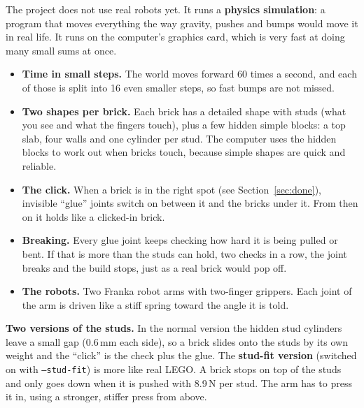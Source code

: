 \documentclass[11pt,a4paper]{article}
\begin{document}
The project does not use real robots yet. It runs a \textbf{physics
simulation}: a program that moves everything the way gravity, pushes and
bumps would move it in real life. It runs on the computer's graphics card,
which is very fast at doing many small sums at once.

\begin{itemize}
\item \textbf{Time in small steps.} The world moves forward 60 times a second,
      and each of those is split into 16 even smaller steps, so fast bumps are
      not missed.
\item \textbf{Two shapes per brick.} Each brick has a detailed shape with
      studs (what you see and what the fingers touch), plus a few hidden simple
      blocks: a top slab, four walls and one cylinder per stud. The computer uses
      the hidden blocks to work out when bricks touch, because simple shapes are
      quick and reliable.
\item \textbf{The click.} When a brick is in the right spot (see
      Section~\ref{sec:done}), invisible ``glue'' joints switch on between it and
      the bricks under it. From then on it holds like a clicked-in brick.
\item \textbf{Breaking.} Every glue joint keeps checking how hard it is being
      pulled or bent. If that is more than the studs can hold, two checks in a row,
      the joint breaks and the build stops, just as a real brick would pop off.
\item \textbf{The robots.} Two Franka robot arms with two-finger grippers. Each
      joint of the arm is driven like a stiff spring toward the angle it is told.
\end{itemize}

\textbf{Two versions of the studs.} In the normal version the hidden stud
cylinders leave a small gap (0.6\,mm each side), so a brick slides onto the
studs by its own weight and the ``click'' is the check plus the glue. The
\textbf{stud-fit version} (switched on with \texttt{--stud-fit}) is more like
real LEGO. A brick stops on top of the studs and only goes down when it is
pushed with 8.9\,N per stud. The arm has to press it in, using a stronger,
stiffer press from above.
\end{document}
